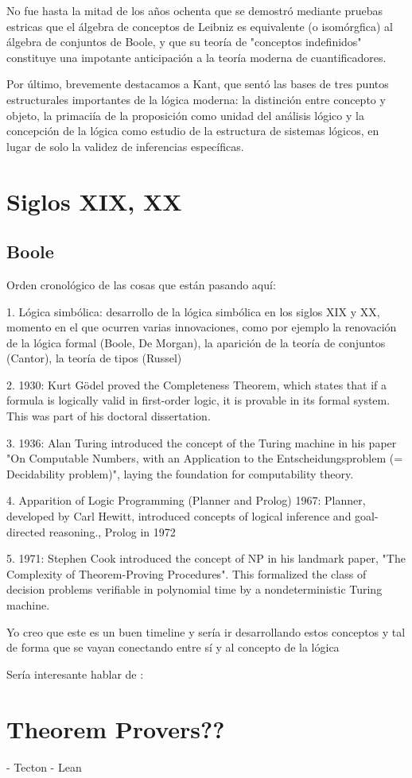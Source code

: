 \documentclass{article}
\begin{document}
No fue hasta la mitad de los años ochenta que se demostró mediante pruebas estricas que el álgebra de conceptos de Leibniz es equivalente (o isomórgfica) al álgebra de conjuntos de Boole, y que su teoría de "conceptos indefinidos" constituye una impotante anticipación a la teoría moderna de cuantificadores.

Por último, brevemente destacamos a Kant, que sentó las bases de tres puntos estructurales importantes de la lógica moderna: la distinción entre concepto y objeto, la primaciía de la proposición como unidad del análisis lógico y la concepción de la lógica como estudio de la estructura de sistemas lógicos, en lugar de solo la validez de inferencias específicas.


\section{Siglos XIX, XX}

\subsection{Boole}

Orden cronológico de las cosas que están pasando aquí:

1. Lógica simbólica: desarrollo de la
lógica simbólica en los siglos XIX y XX, momento en el que ocurren varias
innovaciones, como por ejemplo la renovación de la lógica formal (Boole, De
Morgan), la aparición de la teoría de conjuntos (Cantor), la teoría de tipos
(Russel)

2. 1930: Kurt Gödel proved the Completeness Theorem, which states that if a formula is logically valid in first-order logic, it is provable in its formal system. This was part of his doctoral dissertation.

3. 1936: Alan Turing introduced the concept of the Turing machine in his paper "On Computable Numbers, with an Application to the Entscheidungsproblem (= Decidability problem)", laying the foundation for computability theory.

4. Apparition of Logic Programming (Planner and Prolog) 
1967: Planner, developed by Carl Hewitt, introduced concepts of logical inference and goal-directed reasoning., Prolog in 1972

5. 1971: Stephen Cook introduced the concept of NP in his landmark paper, "The Complexity of Theorem-Proving Procedures". This formalized the class of decision problems verifiable in polynomial time by a nondeterministic Turing machine.

Yo creo que este es un buen timeline y sería ir desarrollando estos conceptos y tal de forma que se vayan conectando entre sí y al concepto de la lógica



Sería interesante hablar de :


\section{Theorem Provers??}
- Tecton
- Lean



\renewcommand{\refname}{Referencias}


\end{document}
